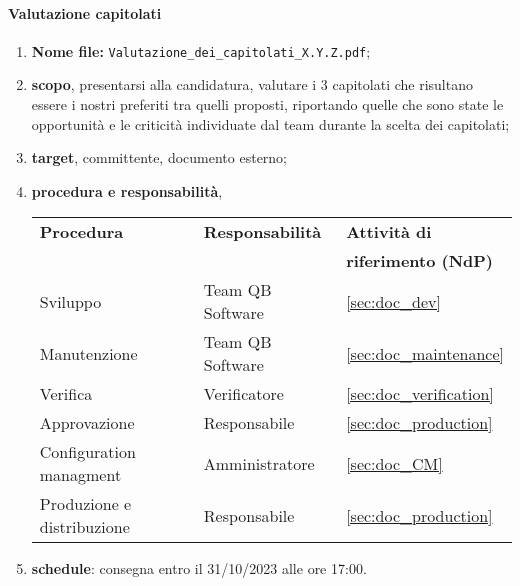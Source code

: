         \paragraph{Valutazione capitolati}
            \begin{enumerate}
                \item \textbf{Nome file:} \texttt{Valutazione\_dei\_capitolati\_X.Y.Z.pdf};
                \item \textbf{scopo}, presentarsi alla candidatura, valutare i 3 capitolati che risultano essere i nostri preferiti tra quelli proposti, riportando quelle che sono state le opportunità e le criticità individuate dal team durante la scelta dei capitolati;
                \item \textbf{target}, committente, documento esterno;
                \item \textbf{procedura e responsabilità},
                \\
                \begin{tabularx}{0.93\textwidth}{|X|X|X|}
                    \hline
                    \textbf{Procedura} & \textbf{Responsabilità} & \textbf{Attività di} \\
                    & & \textbf{riferimento (NdP)} \\
                    \hline
                    Sviluppo & Team QB Software &  \ref{sec:doc_dev}
                    \\\hline
                    Manutenzione & Team QB Software & \ref{sec:doc_maintenance}
                    \\\hline
                    Verifica & Verificatore & \ref{sec:doc_verification}
                    \\\hline
                    Approvazione & Responsabile & \ref{sec:doc_production}
                    \\\hline
                    Configuration managment & Amministratore & \ref{sec:doc_CM}
                    \\\hline
                    Produzione e distribuzione & Responsabile & \ref{sec:doc_production}
                    \\\hline
                \end{tabularx}
                \item \textbf{schedule}: consegna entro il 31/10/2023 alle ore 17:00.
            \end{enumerate} 
            
